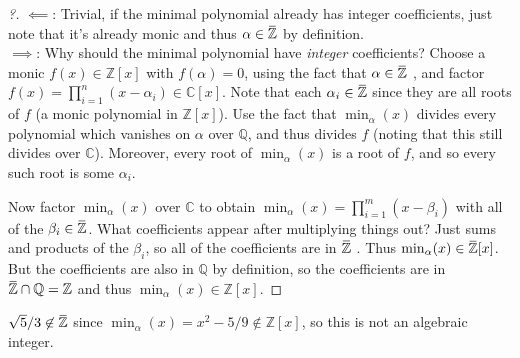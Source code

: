 \begin{proof}[?]

\(\impliedby\): Trivial, if the minimal polynomial already has integer
coefficients, just note that it's already monic and thus
\(\alpha \in \mkern 1.5mu\overline{\mkern-1.5mu{\mathbb{Z}}\mkern-1.5mu}\mkern 1.5mu\)
by definition.\\

\(\implies\): Why should the minimal polynomial have \emph{integer}
coefficients? Choose a monic \(f(x) \in {\mathbb{Z}}[x]\) with
\(f(\alpha) = 0\), using the fact that
\(\alpha\in \mkern 1.5mu\overline{\mkern-1.5mu{\mathbb{Z}}\mkern-1.5mu}\mkern 1.5mu\)
, and factor \(f(x) = \prod_{i=1}^n (x- \alpha_i) \in {\mathbb{C}}[x]\).
Note that each
\(\alpha_i \in \mkern 1.5mu\overline{\mkern-1.5mu{\mathbb{Z}}\mkern-1.5mu}\mkern 1.5mu\)
since they are all roots of \(f\) (a monic polynomial in
\({\mathbb{Z}}[x]\)). Use the fact that \(\min_ \alpha(x)\) divides
every polynomial which vanishes on \(\alpha\) over \({\mathbb{Q}}\), and
thus divides \(f\) (noting that this still divides over
\({\mathbb{C}}\)). Moreover, every root of \(\min_ \alpha(x)\) is a root
of \(f\), and so every such root is some \(\alpha_i\).

\hfill\break

Now factor \(\min_ \alpha(x)\) over \({\mathbb{C}}\) to obtain
\(\min_ \alpha(x) = \prod_{i=1}^m (x - \beta_i)\) with all of the
\(\beta_i \in \mkern 1.5mu\overline{\mkern-1.5mu{\mathbb{Z}}\mkern-1.5mu}\mkern 1.5mu\).
What coefficients appear after multiplying things out? Just sums and
products of the \(\beta_i\), so all of the coefficients are in
\(\mkern 1.5mu\overline{\mkern-1.5mu{\mathbb{Z}}\mkern-1.5mu}\mkern 1.5mu\)
. Thus
\(\min_ \alpha(x) \in \mkern 1.5mu\overline{\mkern-1.5mu{\mathbb{Z}}\mkern-1.5mu}\mkern 1.5mu[x]\).
But the coefficients are also in \({\mathbb{Q}}\) by definition, so the
coefficients are in
\(\mkern 1.5mu\overline{\mkern-1.5mu{\mathbb{Z}}\mkern-1.5mu}\mkern 1.5mu\cap{\mathbb{Q}}= {\mathbb{Z}}\)
and thus \(\min_ \alpha(x) \in {\mathbb{Z}}[x]\).

\end{proof}

\begin{example}

\(\sqrt{5}/ 3 \not\in \mkern 1.5mu\overline{\mkern-1.5mu{\mathbb{Z}}\mkern-1.5mu}\mkern 1.5mu\)
since \(\min_ \alpha(x) = x^2 - 5/9 \not\in {\mathbb{Z}}[x]\), so this
is not an algebraic integer.

\end{example}

